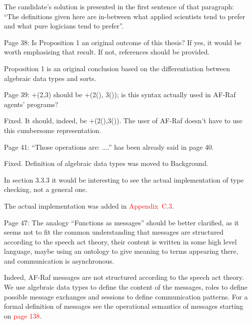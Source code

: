 \documentclass{article}
\newcommand*\R[1]{\textcolor{red}{#1}} %
\newenvironment{them}{\noindent\begingroup\color{blue}}{\endgroup\par}
\begin{document}
The candidate's solution is presented in the first sentence of that paragraph:
``The definitions given here are in-between what applied scientists tend to
prefer and what pure logicians tend to prefer''.

\begin{them}

Page 38:
Is Proposition 1 an original outcome of this thesis? If yes, it would be worth
emphasising that result. If not, references should be provided.

\end{them}
Proposition 1 is an original conclusion based on the differentiation between
algebraic data types and sorts. 

\begin{them}

Page 39:
+(2,3) should be +(2(), 3()); is this syntax actually used in AF-Raf agents'
programs?

\end{them}

Fixed. It should, indeed, be +(2(),3()). The user of AF-Raf doesn't have to use
this cumbersome representation.

\begin{them}

Page 41:
``Those operations are: ....'' has been already said in page 40.
\end{them}

Fixed. Definition of algebraic data types was moved to Background.

\begin{them}

In section 3.3.3 it would be interesting to see the actual implementation of
type checking, not a general one.

\end{them}

The actual implementation was added in \R{Appendix~C.3}.

\begin{them}

Page 47:
The analogy ``Functions as messages'' should be better clarified, as it seems not
to fit the common understanding that messages are structured according to the
speech act theory, their content is written in some high level language, maybe
using an ontology to give meaning to terms appearing there, and communication
is asynchronous.

\end{them}
Indeed, AF-Raf messages are not structured according to  the speech act
theory.  We use algebraic data types to define the content of the messages,
roles to define possible message exchanges and sessions to define communication
patterns. For a formal definition of messages see the operational semantics of
messages starting on \R{page 138}.
\end{document}
